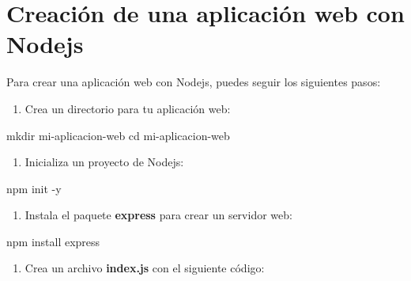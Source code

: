 \documentclass[
  a4paper,
  DIV=11,
  numbers=noendperiod,
  onepage,
  openany]{scrreprt}
\newenvironment{Shaded}{\begin{snugshade}}{\end{snugshade}}
\newcommand{\AttributeTok}[1]{\textcolor[rgb]{0.40,0.45,0.13}{#1}}
\newcommand{\BuiltInTok}[1]{\textcolor[rgb]{0.00,0.23,0.31}{#1}}
\newcommand{\ExtensionTok}[1]{\textcolor[rgb]{0.00,0.23,0.31}{#1}}
\newcommand{\FunctionTok}[1]{\textcolor[rgb]{0.28,0.35,0.67}{#1}}
\newcommand{\NormalTok}[1]{\textcolor[rgb]{0.00,0.23,0.31}{#1}}
\providecommand{\tightlist}{%
  \setlength{\itemsep}{0pt}\setlength{\parskip}{0pt}}\usepackage{longtable,booktabs,array}
\begin{document}
\section{Creación de una aplicación web con
Nodejs}\label{creaciuxf3n-de-una-aplicaciuxf3n-web-con-nodejs}

Para crear una aplicación web con Nodejs, puedes seguir los siguientes
pasos:

\begin{enumerate}
\def\labelenumi{\arabic{enumi}.}
\tightlist
\item
  Crea un directorio para tu aplicación web:
\end{enumerate}

\begin{Shaded}
\begin{Highlighting}[]
\FunctionTok{mkdir}\NormalTok{ mi{-}aplicacion{-}web}
\BuiltInTok{cd}\NormalTok{ mi{-}aplicacion{-}web}
\end{Highlighting}
\end{Shaded}

\begin{enumerate}
\def\labelenumi{\arabic{enumi}.}
\setcounter{enumi}{1}
\tightlist
\item
  Inicializa un proyecto de Nodejs:
\end{enumerate}

\begin{Shaded}
\begin{Highlighting}[]
\ExtensionTok{npm}\NormalTok{ init }\AttributeTok{{-}y}
\end{Highlighting}
\end{Shaded}

\begin{enumerate}
\def\labelenumi{\arabic{enumi}.}
\setcounter{enumi}{2}
\tightlist
\item
  Instala el paquete \textbf{express} para crear un servidor web:
\end{enumerate}

\begin{Shaded}
\begin{Highlighting}[]
\ExtensionTok{npm}\NormalTok{ install express}
\end{Highlighting}
\end{Shaded}

\begin{enumerate}
\def\labelenumi{\arabic{enumi}.}
\setcounter{enumi}{3}
\tightlist
\item
  Crea un archivo \textbf{index.js} con el siguiente código:
\end{enumerate}
\end{document}
